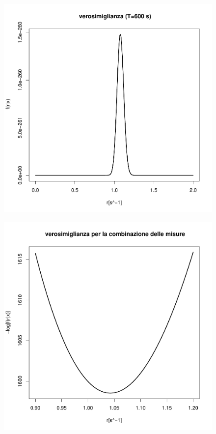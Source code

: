 \documentclass[10pt,oneside,a4paper]{article}
\begin{document}
\begin{figure}
\centering
\includegraphics{verosimiglianza600sec.pdf}
\label{fig:verosimiglianza600sec}
\end{figure}

\begin{figure}
\centering
\includegraphics{verosimiglianza_comb.pdf}
\label{fig:verosimiglianzacombinata}
\end{figure}
\end{document}
